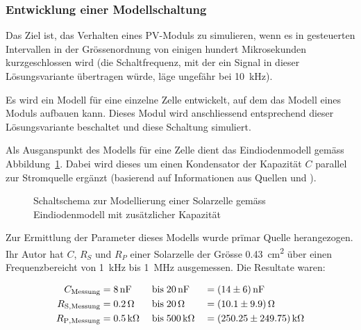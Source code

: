 \subsubsection{Entwicklung einer Modellschaltung}
\label{subsubsec:hw:ask:modell}

Das  Ziel  ist,   das  Verhalten  eines  PV-Moduls  zu   simulieren,  wenn  es
in  gesteuerten  Intervallen  in  der  Gr\"ossenordnung  von  einigen  hundert
Mikrosekunden  kurzgeschlossen wird  (die Schaltfrequenz,  mit der  ein Signal
in  dieser  L\"osungsvariante  \"ubertragen  w\"urde,  l\"age  ungef\"ahr  bei
\SI{10}{\kilo\hertz}).

Es wird  ein Modell f\"ur eine  einzelne Zelle entwickelt, auf  dem das Modell
eines  Moduls  aufbauen  kann. Dieses Modul  wird  anschliessend  entsprechend
dieser L\"osungsvariante beschaltet und diese Schaltung simuliert.

Als    Ausganspunkt    des    Modells    f\"ur   eine    Zelle    dient    das
Eindiodenmodell          gem\"ass
Abbildung~\ref{fig:circuit:solarCell}. Dabei    wird     dieses    um    einen
Kondensator   der  Kapazit\"at   $C$   parallel   zur  Stromquelle   erg\"anzt
(basierend  auf   Informationen  aus  Quellen   \cite{ref:solar:scofield}  und
\cite{ref:solar:friesen}).

\begin{figure}[h!tb]
    \centering
    
    \caption{%
        Schaltschema    zur    Modellierung    einer    Solarzelle    gem\"ass
        Eindiodenmodell mit zus\"atzlicher Kapazit\"at%
    }
    \label{fig:circuit:solarCell}
\end{figure}

Zur   Ermittlung  der   Parameter   dieses  Modells   wurde  pr\"imar   Quelle
\cite{ref:solar:scofield}  herangezogen. Ihr   Autor  hat  $C$,   $R_{S}$  und
$R_{P}$ einer  Solarzelle der Gr\"osse  \SI{0.43}{\centi\meter\squared} \"uber
einen   Frequenzbereicht  von   \SI{1}{\kilo\hertz}  bis   \SI{1}{\mega\hertz}
ausgemessen. Die Resultate waren:

\begin{alignat}{3}
    \label{eq:scofield:C}
    C_{\mathrm{Messung}}    &= \SI{8}{\nano\farad} \; & \text{bis} \; & \SI{20}{\nano\farad} \;  & = & \; \SI{14 \pm 6}{\nano\farad} \\
    \label{eq:scofield:Rs}
    R_{\mathrm{S, Messung}} &= \SI{0.2}{\ohm}      \; & \text{bis} \; & \SI{20}{\ohm}        \;  & = & \; \SI{10.1 \pm 9.9}{\ohm}     \\
    \label{eq:scofield:Rp}
    R_{\mathrm{P, Messung}} &= \SI{0.5}{\kilo\ohm} \; & \text{bis} \; & \SI{500}{\kilo\ohm}  \;  & = & \; \SI{250.25 \pm 249.75}{\kilo\ohm}
\end{alignat}

